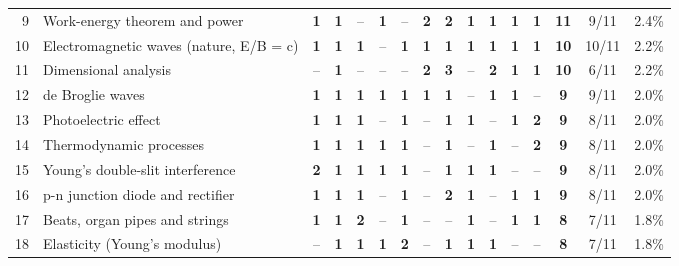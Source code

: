 \documentclass[10pt,a4paper]{article}
\begin{document}
{\begin{tabularx}{\linewidth}{@{}r>{\raggedright\arraybackslash}X*{11}{c}ccc@{}}
9 & Work-energy theorem and power & \textbf{1} & \textbf{1} & {\color{gray!60}--} & \textbf{1} & {\color{gray!60}--} & \textbf{2} & \textbf{2} & \textbf{1} & \textbf{1} & \textbf{1} & \textbf{1} & \textbf{11} & 9/11 & 2.4\%\\
10 & Electromagnetic waves (nature, E/B = c) & \textbf{1} & \textbf{1} & \textbf{1} & {\color{gray!60}--} & \textbf{1} & \textbf{1} & \textbf{1} & \textbf{1} & \textbf{1} & \textbf{1} & \textbf{1} & \textbf{10} & 10/11 & 2.2\%\\
11 & Dimensional analysis & {\color{gray!60}--} & \textbf{1} & {\color{gray!60}--} & {\color{gray!60}--} & {\color{gray!60}--} & \textbf{2} & \textbf{3} & {\color{gray!60}--} & \textbf{2} & \textbf{1} & \textbf{1} & \textbf{10} & 6/11 & 2.2\%\\
12 & de Broglie waves & \textbf{1} & \textbf{1} & \textbf{1} & \textbf{1} & \textbf{1} & \textbf{1} & \textbf{1} & {\color{gray!60}--} & \textbf{1} & \textbf{1} & {\color{gray!60}--} & \textbf{9} & 9/11 & 2.0\%\\
13 & Photoelectric effect & \textbf{1} & \textbf{1} & \textbf{1} & {\color{gray!60}--} & \textbf{1} & {\color{gray!60}--} & \textbf{1} & \textbf{1} & {\color{gray!60}--} & \textbf{1} & \textbf{2} & \textbf{9} & 8/11 & 2.0\%\\
14 & Thermodynamic processes & \textbf{1} & \textbf{1} & \textbf{1} & \textbf{1} & \textbf{1} & {\color{gray!60}--} & \textbf{1} & {\color{gray!60}--} & \textbf{1} & {\color{gray!60}--} & \textbf{2} & \textbf{9} & 8/11 & 2.0\%\\
15 & Young's double-slit interference & \textbf{2} & \textbf{1} & \textbf{1} & \textbf{1} & \textbf{1} & {\color{gray!60}--} & \textbf{1} & \textbf{1} & \textbf{1} & {\color{gray!60}--} & {\color{gray!60}--} & \textbf{9} & 8/11 & 2.0\%\\
16 & p-n junction diode and rectifier & \textbf{1} & \textbf{1} & \textbf{1} & {\color{gray!60}--} & \textbf{1} & {\color{gray!60}--} & \textbf{2} & \textbf{1} & {\color{gray!60}--} & \textbf{1} & \textbf{1} & \textbf{9} & 8/11 & 2.0\%\\
17 & Beats, organ pipes and strings & \textbf{1} & \textbf{1} & \textbf{2} & {\color{gray!60}--} & \textbf{1} & {\color{gray!60}--} & {\color{gray!60}--} & \textbf{1} & {\color{gray!60}--} & \textbf{1} & \textbf{1} & \textbf{8} & 7/11 & 1.8\%\\
18 & Elasticity (Young's modulus) & {\color{gray!60}--} & \textbf{1} & \textbf{1} & \textbf{1} & \textbf{2} & {\color{gray!60}--} & \textbf{1} & \textbf{1} & \textbf{1} & {\color{gray!60}--} & {\color{gray!60}--} & \textbf{8} & 7/11 & 1.8\%\\

\end{tabularx}}
\end{document}
